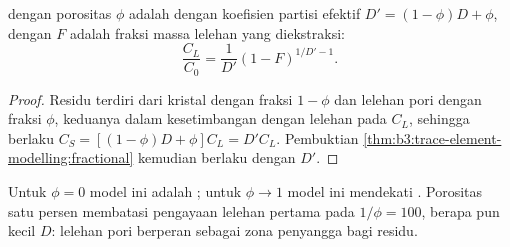 \begin{proposition}\label{prop:b3:trace-element-modelling:dynamic}
 dengan porositas $\phi$ adalah  dengan koefisien partisi efektif
$D' = (1 - \phi)D + \phi$, dengan $F$ adalah fraksi massa
lelehan yang diekstraksi:
\[
\frac{C_L}{C_0} = \frac{1}{D'}(1 - F)^{1/D' - 1}.
\]
\end{proposition}

\begin{proof}
Residu terdiri dari kristal dengan fraksi $1 - \phi$ dan lelehan pori dengan
fraksi $\phi$, keduanya dalam kesetimbangan dengan lelehan pada $C_L$, sehingga berlaku
$C_S = [(1 - \phi)D + \phi]C_L = D'C_L$. Pembuktian
\cref{thm:b3:trace-element-modelling:fractional} kemudian berlaku dengan $D'$.
\end{proof}

Untuk $\phi = 0$ model ini adalah ; untuk $\phi \to 1$ model ini
mendekati . Porositas satu persen membatasi pengayaan
lelehan pertama pada $1/\phi = 100$, berapa pun kecil $D$: lelehan pori berperan
sebagai zona penyangga bagi residu.

